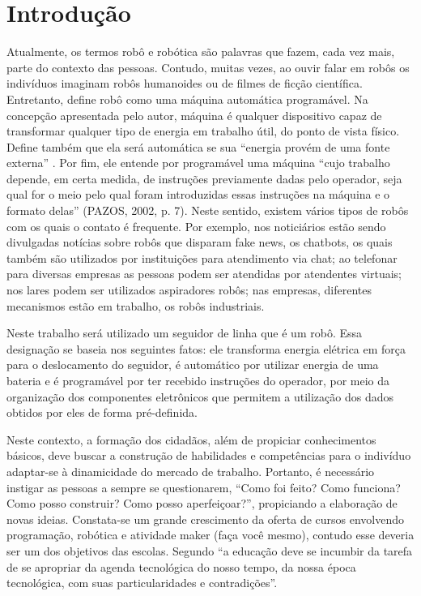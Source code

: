 \documentclass{textolivre}
\begin{document}
\begin{polyabstract}
\begin{english}
\begin{abstract}
\end{abstract}
\end{english}

\end{polyabstract}


\section{Introdução}\label{sec-intro}
Atualmente, os termos robô e robótica são palavras que fazem, cada vez mais,
parte do contexto das pessoas. Contudo, muitas vezes, ao ouvir falar em robôs
os indivíduos imaginam robôs humanoides ou de filmes de ficção científica.
Entretanto, \textcite[p. 8]{pazos2002} define robô como uma máquina automática
programável. Na concepção apresentada pelo autor, máquina é qualquer
dispositivo capaz de transformar qualquer tipo de energia em trabalho útil, do
ponto de vista físico. Define também que ela será automática se sua “energia
provém de uma fonte externa” \cite[p. 7]{pazos2002}. Por fim, ele entende por
programável uma máquina “cujo trabalho depende, em certa medida, de instruções
previamente dadas pelo operador, seja qual for o meio pelo qual foram
introduzidas essas instruções na máquina e o formato delas” (PAZOS, 2002, p.
7). Neste sentido, existem vários tipos de robôs com os quais o contato é
frequente. Por exemplo, nos noticiários estão sendo divulgadas notícias sobre
robôs que disparam fake news, os chatbots, os quais também são utilizados por
instituições para atendimento via chat; ao telefonar para diversas empresas as
pessoas podem ser atendidas por atendentes virtuais; nos lares podem ser
utilizados aspiradores robôs; nas empresas, diferentes mecanismos estão em
trabalho, os robôs industriais.

Neste trabalho será utilizado um seguidor de linha que é um robô. Essa
designação se baseia nos seguintes fatos: ele transforma energia elétrica em
força para o deslocamento do seguidor, é automático por utilizar energia de uma
bateria e é programável por ter recebido instruções do operador, por meio da
organização dos componentes eletrônicos que permitem a utilização dos dados
obtidos por eles de forma pré-definida.

Neste contexto, a formação dos cidadãos, além de propiciar conhecimentos
básicos, deve buscar a construção de habilidades e competências para o
indivíduo adaptar-se à dinamicidade do mercado de trabalho. Portanto, é
necessário instigar as pessoas a sempre se questionarem, “Como foi feito? Como
funciona? Como posso construir? Como posso aperfeiçoar?”, propiciando a
elaboração de novas ideias. Constata-se um grande crescimento da oferta de
cursos envolvendo programação, robótica e atividade maker (faça você mesmo),
contudo esse deveria ser um dos objetivos das escolas. Segundo \textcite[p. 27]{santos2019}
“a educação deve se incumbir da tarefa de se apropriar da agenda
tecnológica do nosso tempo, da nossa época tecnológica, com suas
particularidades e contradições”.
\end{document}

